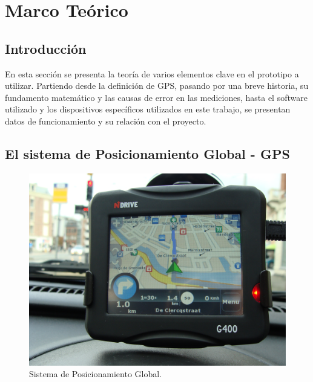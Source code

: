 
\chapter{Marco Teórico} %

\label{Chap:Marco} %




\section{Introducción}

En esta sección se presenta la teoría de varios elementos clave en el prototipo a utilizar. Partiendo desde la definición de GPS, pasando por una breve historia, su fundamento matemático y las causas de error en las mediciones, hasta el software utilizado y los dispositivos específicos utilizados en este trabajo, se presentan datos de funcionamiento y su relación con el proyecto.

\section{El sistema de Posicionamiento Global - GPS}

\begin{figure}[ht]
\centering
\includegraphics[scale=0.07]{Figures/GPS}
\caption[Sistema de Posicionamiento Global.]{Sistema de Posicionamiento Global.\footnotemark}
\label{fig:GPS}
\end{figure}

